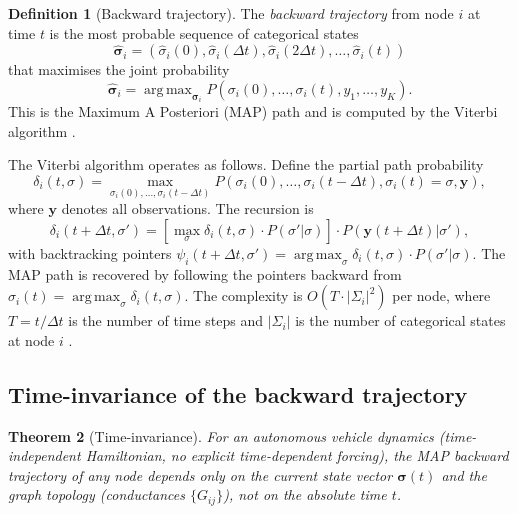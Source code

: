 \documentclass[twocolumn,10pt,a4paper]{article}
\newtheorem{theorem}{Theorem}[section]
\theoremstyle{definition}
\newtheorem{definition}[theorem]{Definition}
\theoremstyle{remark}
\newcommand{\vect}[1]{\boldsymbol{#1}}
\DeclareMathOperator*{\argmax}{arg\,max}
\begin{document}
\begin{definition}[Backward trajectory]\label{def:backward_traj}
The \emph{backward trajectory} from node $i$ at time $t$ is the most probable sequence of categorical states
\begin{equation}\label{eq:backward_traj}
\hat{\vect{\sigma}}_i = (\hat{\sigma}_i(0), \hat{\sigma}_i(\Delta t), \hat{\sigma}_i(2\Delta t), \ldots, \hat{\sigma}_i(t))
\end{equation}
that maximises the joint probability
\begin{equation}\label{eq:viterbi_objective}
\hat{\vect{\sigma}}_i = \argmax_{\vect{\sigma}_i} P(\sigma_i(0), \ldots, \sigma_i(t), y_1, \ldots, y_K).
\end{equation}
This is the Maximum A Posteriori (MAP) path and is computed by the Viterbi algorithm \citep{Viterbi1967}.
\end{definition}

The Viterbi algorithm operates as follows. Define the partial path probability
\begin{equation}\label{eq:viterbi_delta}
\delta_i(t, \sigma) = \max_{\sigma_i(0), \ldots, \sigma_i(t-\Delta t)} P(\sigma_i(0), \ldots, \sigma_i(t-\Delta t), \sigma_i(t) = \sigma, \vect{y}),
\end{equation}
where $\vect{y}$ denotes all observations. The recursion is
\begin{equation}\label{eq:viterbi_recursion}
\delta_i(t+\Delta t, \sigma') = \left[\max_{\sigma} \delta_i(t, \sigma) \cdot P(\sigma' | \sigma)\right] \cdot P(\vect{y}(t+\Delta t) | \sigma'),
\end{equation}
with backtracking pointers $\psi_i(t+\Delta t, \sigma') = \argmax_\sigma \delta_i(t, \sigma) \cdot P(\sigma' | \sigma)$. The MAP path is recovered by following the pointers backward from $\hat{\sigma}_i(t) = \argmax_\sigma \delta_i(t, \sigma)$. The complexity is $O(T \cdot |\Sigma_i|^2)$ per node, where $T = t/\Delta t$ is the number of time steps and $|\Sigma_i|$ is the number of categorical states at node $i$ \citep{Rabiner1989}.

\subsection{Time-invariance of the backward trajectory}

\begin{theorem}[Time-invariance]\label{thm:time_invariance}
For an autonomous vehicle dynamics (time-independent Hamiltonian, no explicit time-dependent forcing), the MAP backward trajectory of any node depends only on the current state vector $\vect{\sigma}(t)$ and the graph topology (conductances $\{G_{ij}\}$), not on the absolute time $t$.
\end{theorem}
\end{document}

